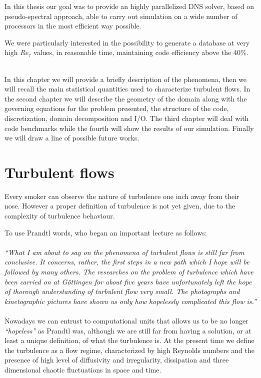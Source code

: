 In this thesis our goal was to provide an highly parallelized DNS solver, based on pseudo-spectral approach, able to carry out simulation on a wide number of processors in the most efficient way possible. \par
We were particularly interested in the possibility to generate a database at very high $Re_{\tau}$ values, in reasonable time, maintaining code efficiency above the 40\%. \\~\par

In this chapter we will provide a briefly description of the phenomena, then we will recall the main statistical quantities used to characterize turbulent flows. In the second chapter we will describe the geometry of the domain along with the governing equations for the problem presented, the structure of the code, discretization, domain decomposition and I/O.
The third chapter will deal with code benchmarks while the fourth will show the results of our simulation. Finally we will draw a line of possible future works.

\section{Turbulent flows}
Every smoker can observe the nature of turbulence one inch away from their nose.
However a proper definition of turbulence is not yet given, due to the complexity of turbulence behaviour. \par
To use Prandtl words, who began an important lecture as follows: \\~\\
\emph{``What I am about to say on the phenomena of turbulent flows is still far from conclusive. It concerns, rather, the first steps in a new path which I hope will be followed by many others. The researches on the problem of turbulence which have been carried on at G\"{o}ttingen for about five years have unfortunately left the hope of thorough understanding of turbulent flow very small. The photographs and kinetographic pictures have shown us only how hopelessly complicated this flow is.''} \\~\\

Nowadays we can entrust to computational units that allows us to be no longer \emph{``hopeless''} as Prandtl was, although we are still far from having a solution, or at least a unique definition, of what the turbulence is. 
At the present time we define the turbulence as a flow regime, characterized by high Reynolds numbers and the presence of high level of diffusivity and irregularity, dissipation and three dimensional chaotic fluctuations in space and time\cite{turbulence:def}.

